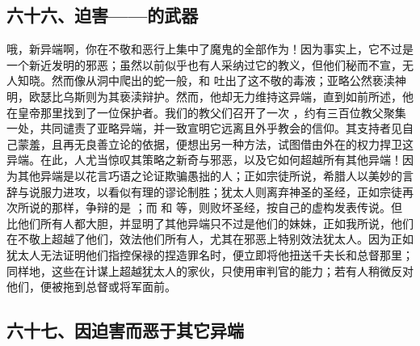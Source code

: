 
\subsection{六十六、迫害——的武器}

哦，新异端啊，你在不敬和恶行上集中了魔鬼的全部作为！因为事实上，它不过是一个新近发明的邪恶；虽然以前似乎也有人采纳过它的教义，但他们秘而不宣，无人知晓。然而像从洞中爬出的蛇一般，和 吐出了这不敬的毒液；亚略公然亵渎神明，欧瑟比乌斯则为其亵渎辩护。然而，他却无力维持这异端，直到如前所述，他在皇帝那里找到了一位保护者。我们的教父们召开了一次 ，约有三百位教父聚集一处，共同谴责了亚略异端，并一致宣明它远离且外乎教会的信仰。其支持者见自己蒙羞，且再无良善立论的依据，便想出另一种方法，试图借由外在的权力捍卫这异端。在此，人尤当惊叹其策略之新奇与邪恶，以及它如何超越所有其他异端！因为其他异端是以花言巧语之论证欺骗愚拙的人；正如宗徒所说，希腊人以美妙的言辞与说服力进攻，以看似有理的谬论制胜；犹太人则离弃神圣的圣经，正如宗徒再次所说的那样，争辩的是 ；而  和  等，则败坏圣经，按自己的虚构发表传说。但  比他们所有人都大胆，并显明了其他异端只不过是他们的妹妹，正如我所说，他们在不敬上超越了他们，效法他们所有人，尤其在邪恶上特别效法犹太人。因为正如犹太人无法证明他们指控保禄的捏造罪名时，便立即将他扭送千夫长和总督那里；同样地，这些在计谋上超越犹太人的家伙，只使用审判官的能力；若有人稍微反对他们，便被拖到总督或将军面前。\par


\subsection{六十七、因迫害而恶于其它异端}

